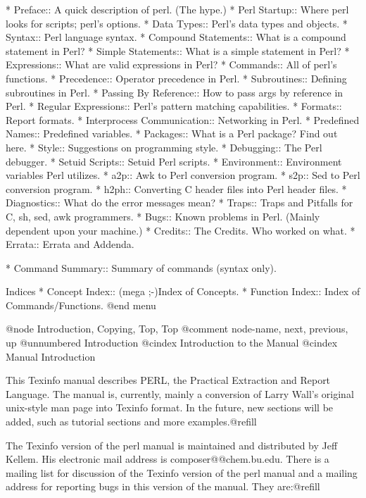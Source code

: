 * Preface::               A quick description of perl.  (The hype.)
* Perl Startup::          Where perl looks for scripts; perl's options.
* Data Types::            Perl's data types and objects.
* Syntax::                Perl language syntax.
* Compound Statements::   What is a compound statement in Perl?
* Simple Statements::     What is a simple statement in Perl?
* Expressions::           What are valid expressions in Perl?
* Commands::              All of perl's functions.
* Precedence::            Operator precedence in Perl.
* Subroutines::           Defining subroutines in Perl.
* Passing By Reference::  How to pass args by reference in Perl.
* Regular Expressions::   Perl's pattern matching capabilities.
* Formats::               Report formats.
* Interprocess Communication:: Networking in Perl.
* Predefined Names::      Predefined variables.
* Packages::              What is a Perl package?  Find out here.
* Style::                 Suggestions on programming style.
* Debugging::             The Perl debugger.
* Setuid Scripts::        Setuid Perl scripts.
* Environment::           Environment variables Perl utilizes.
* a2p::                   Awk to Perl conversion program.
* s2p::                   Sed to Perl conversion program.
* h2ph::                  Converting C header files into Perl header files.
* Diagnostics::           What do the error messages mean?
* Traps::                 Traps and Pitfalls for C, sh, sed, awk programmers.
* Bugs::                  Known problems in Perl.
                            (Mainly dependent upon your machine.)
* Credits::               The Credits.  Who worked on what.
* Errata::                Errata and Addenda.


* Command Summary::     Summary of commands (syntax only).

Indices
* Concept Index::       (mega ;-)Index of Concepts.
* Function Index::      Index of Commands/Functions.
@end menu

@node     Introduction, Copying, Top, Top
@comment  node-name,  next,  previous,  up
@unnumbered Introduction
@cindex Introduction to the Manual
@cindex Manual Introduction

This Texinfo manual describes PERL, the Practical Extraction and
Report Language.  The manual is, currently, mainly a conversion of Larry
Wall's original unix-style man page into Texinfo format.  In the
future, new sections will be added, such as tutorial sections and more
examples.@refill

The Texinfo version of the perl manual is maintained and distributed by
Jeff Kellem.  His electronic mail address is composer@@chem.bu.edu.
There is a mailing list for discussion of the Texinfo version of the
perl manual and a mailing address for reporting bugs in this version of
the manual.  They are:@refill

